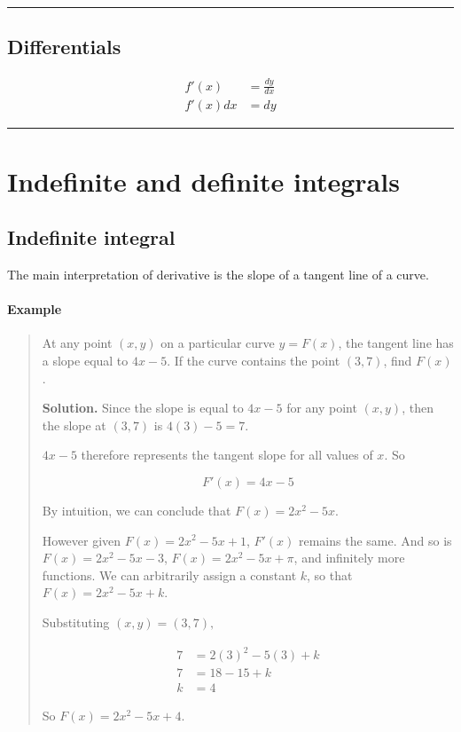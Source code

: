 \documentclass[
]{article}
\begin{document}
\begin{center}\rule{0.5\linewidth}{0.5pt}\end{center}

\hypertarget{differentials}{%
\subsection{Differentials}\label{differentials}}

\begin{align*}
f'(x)   &= \frac{dy}{dx}\\
f'(x)dx &= dy
\end{align*}

\begin{center}\rule{0.5\linewidth}{0.5pt}\end{center}

\hypertarget{indefinite-and-definite-integrals}{%
\section{Indefinite and definite
integrals}\label{indefinite-and-definite-integrals}}

\hypertarget{indefinite-integral}{%
\subsection{Indefinite integral}\label{indefinite-integral}}

The main interpretation of derivative is the slope of a tangent line of
a curve.

\hypertarget{example-1}{%
\paragraph*{Example}\label{example-1}}

\begin{quote}
At any point \((x,y)\) on a particular curve \(y=F(x)\), the tangent
line has a slope equal to \(4x-5\). If the curve contains the point
\((3,7)\), find \(F(x)\).

\textbf{Solution.} Since the slope is equal to \(4x-5\) for any point
\((x,y)\), then the slope at \((3,7)\) is \(4(3)-5=7\).

\(4x-5\) therefore represents the tangent slope for all values of \(x\).
So

\[ F'(x)=4x-5 \]

By intuition, we can conclude that \(F(x)=2x^2-5x\).

However given \(F(x)=2x^2-5x+1\), \(F'(x)\) remains the same. And so is
\(F(x)=2x^2-5x-3\), \(F(x)=2x^2-5x+\pi\), and infinitely more functions.
We can arbitrarily assign a constant \(k\), so that \(F(x)=2x^2-5x+k\).

Substituting \((x,y)=(3,7),\)

\begin{align*}
7 &= 2(3)^2 - 5(3) +k\\
7 &= 18 - 15 + k \\
k &= 4 
\end{align*}

So \(F(x)=2x^2-5x+4\).
\end{quote}
\end{document}
